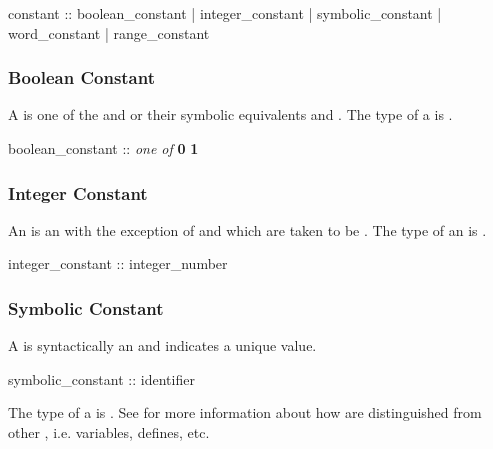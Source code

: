 \begin{Grammar}
constant ::
        boolean_constant
      | integer_constant
      | symbolic_constant
      | word_constant
      | range_constant
\end{Grammar}

\subsubsection{Boolean Constant}
\label{Boolean Constant}

A  is one of the 
 and  or their symbolic equivalents 
and .
%
The type of a  is \Boolean.

\begin{Grammar}
boolean_constant :: \emph{one of}
        \textbf{0} \textbf{1}  
\end{Grammar}

\subsubsection{Integer Constant}
\label{Integer Constant}

An  is an  with the
exception of  and  which are taken to be .  The type of an  is \Integer.

\begin{Grammar}
integer_constant :: integer_number
\end{Grammar}

\subsubsection{Symbolic Constant}
\label{Symbolic Constant}

A  is syntactically an 
and indicates a unique value.

\begin{Grammar}
symbolic_constant :: identifier
\end{Grammar}

\noindent The type of a  is \SymbEnum. 
%
See  for more information about how
 are distinguished from other
, i.e. variables, defines, etc.

